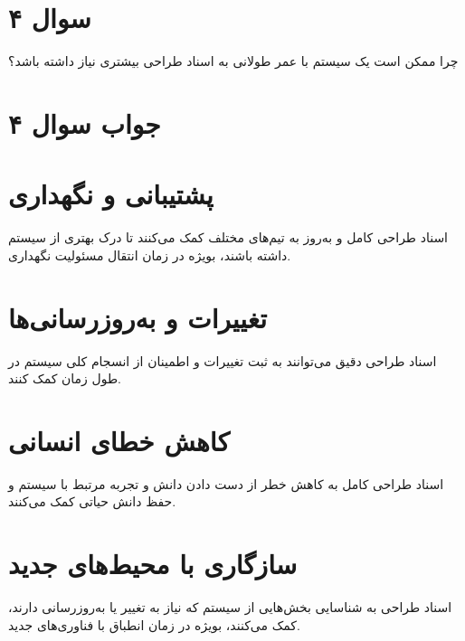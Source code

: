 \section*{سوال ۴}

چرا ممکن است یک سیستم با عمر طولانی به اسناد طراحی بیشتری نیاز داشته باشد؟

\section*{جواب سوال ۴}

\section{پشتیبانی و نگهداری}
اسناد طراحی کامل و به‌روز به تیم‌های مختلف کمک می‌کنند تا درک بهتری از سیستم داشته باشند، بویژه در زمان انتقال مسئولیت نگهداری.

\section{تغییرات و به‌روزرسانی‌ها}
اسناد طراحی دقیق می‌توانند به ثبت تغییرات و اطمینان از انسجام کلی سیستم در طول زمان کمک کنند.

\section{کاهش خطای انسانی}
اسناد طراحی کامل به کاهش خطر از دست دادن دانش و تجربه مرتبط با سیستم و حفظ دانش حیاتی کمک می‌کنند.

\section{سازگاری با محیط‌های جدید}
اسناد طراحی به شناسایی بخش‌هایی از سیستم که نیاز به تغییر یا به‌روزرسانی دارند، کمک می‌کنند، بویژه در زمان انطباق با فناوری‌های جدید.
